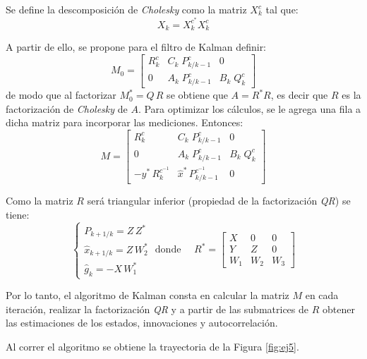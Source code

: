 	
	Se define la descomposición de \emph{Cholesky} como la matriz $X^{c}_k$ tal que:
	\begin{equation*}
		X_k = X^{c^{*}}_k X^{c}_k
	\end{equation*}	

	A partir de ello, se propone para el filtro de Kalman definir: 
	\begin{equation*}
		M_0 = \begin{bmatrix} R^{c}_k& C_k\; P^c_{k/k-1}& 0 \\[0.3em] 0& A_k\; P^c_{k/k-1}& B_k\; Q^c_k \end{bmatrix}
	\end{equation*}
	de modo que al factorizar $M^*_0 = Q\,R$ se obtiene que $A=R^* R$, es decir que $R$ es la factorización de \emph{Cholesky} de $A$. Para optimizar los cálculos, se le agrega una fila a dicha matriz para incorporar las mediciones. Entonces:
	\begin{equation*}
	M =  \begin{bmatrix} R^{c}_k& C_k\; P^c_{k/k-1}& 0 \\[0.3em] 0& A_k\; P^c_{k/k-1}& B_k\; Q^c_k \\[0.3em] -y^*\,R^{c^{-1}}_k & \hat{x}^*\, P^{c^{-1}}_{k/k-1} & 0 \end{bmatrix}
	\end{equation*}

	Como la matriz $R$ será triangular inferior (propiedad de la factorización \emph{QR}) se tiene:
	\begin{equation*}
	 \begin{cases} P_{k+1/k} = Z\,Z^*\\ \hat{x}_{k+1/k}=Z\,W^*_2\\ \hat{g}_k = -X\,W^*_1\end{cases} \text{ donde }\quad R^* = \begin{bmatrix} X&0&0\\[0.3em]Y&Z&0\\[0.3em]W_1&W_2&W_3\end{bmatrix}
	\end{equation*}

	Por lo tanto, el algoritmo de Kalman consta en calcular la matriz $M$ en cada iteración, realizar la factorización \emph{QR} y a partir de las submatrices de $R$ obtener las estimaciones de los estados, innovaciones y autocorrelación.

	Al correr el algoritmo se obtiene la trayectoria de la Figura \ref{fig:ej5}.

	\vspace*{\fill}

